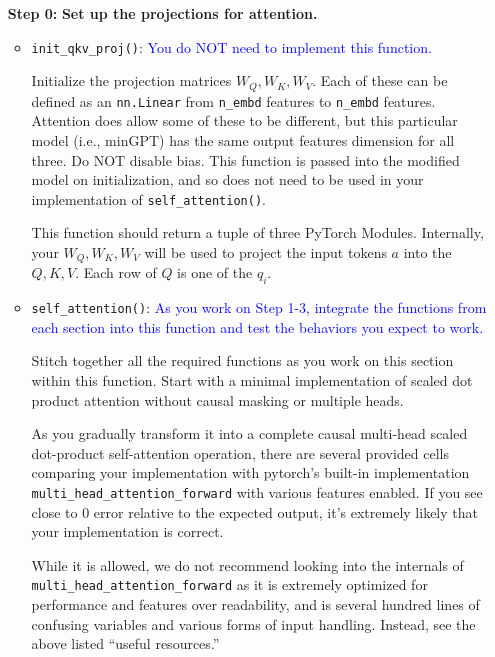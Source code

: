 \documentclass{article}
\begin{document}
    \begin{enumerate}
        \item[\textbf{Step 0:}]
        \textbf{Set up the projections for attention.}

        
        \begin{itemize}
        \item \verb|init_qkv_proj()|: \textcolor{blue}{You do NOT need to
        implement this function.}
        
        Initialize the projection matrices $W_Q, W_K, W_V$. Each of these can be
        defined as an \verb|nn.Linear| from \verb|n_embd| features to
        \verb|n_embd| features. Attention does allow some of these to be
        different, but this particular model (i.e., minGPT) has the same output
        features dimension for all three. Do NOT disable bias. This function is
        passed into the modified model on initialization, and so does not need
        to be used in your implementation of \verb|self_attention()|.

        This function should return a tuple of three PyTorch Modules.
        Internally, your $W_Q, W_K, W_V$ will be used to project the input
        tokens $a$ into the  $Q, K, V$. Each row of $Q$ is one of the $q_i$.
        
        \item  \verb|self_attention()|: \textcolor{blue}{As you work on Step
        1-3, integrate the functions from each section into this function and
        test the behaviors you expect to work.}
        
        Stitch together all the required functions as you work on this section
        within this function. Start with a minimal implementation of scaled dot
        product attention without causal masking or multiple heads. 
        
        As you gradually transform it into a complete causal multi-head scaled
        dot-product self-attention operation, there are several provided cells
        comparing your implementation with pytorch's built-in implementation
        \verb|multi_head_attention_forward| with various features enabled. If
        you see close to 0 error relative to the expected output, it's extremely
        likely that your implementation is correct.
        
        While it is allowed, we do not recommend looking into the internals of
        \verb|multi_head_attention_forward| as it is extremely optimized for
        performance and features over readability, and is several hundred lines
        of confusing variables and various forms of input handling. Instead, see
        the above listed ``useful resources.''



\end{itemize}
\end{enumerate}
\end{document}

